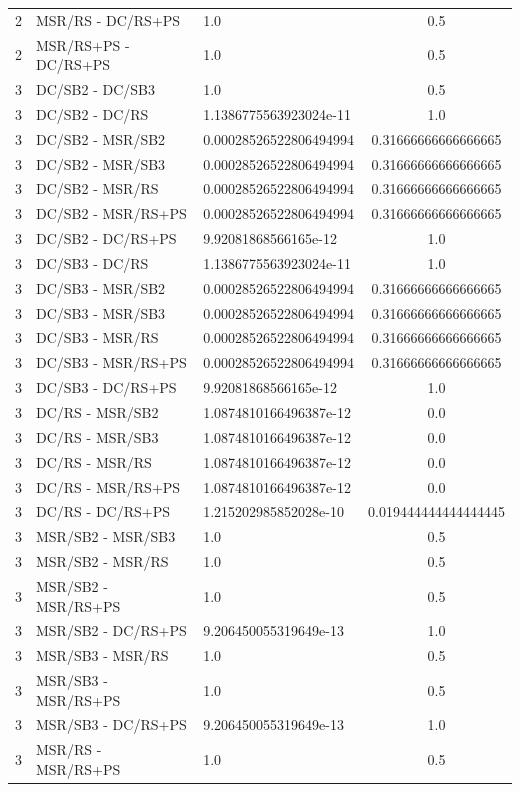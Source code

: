 \documentclass[10pt,a4paper]{article}
\begin{document}
\begin{longtable}{c l l c}
2 & MSR/RS - DC/RS+PS & 1.0 & 0.5 \\
2 & MSR/RS+PS - DC/RS+PS & 1.0 & 0.5 \\
\midrule
3 & DC/SB2 - DC/SB3 & 1.0 & 0.5 \\
3 & DC/SB2 - DC/RS & 1.1386775563923024e-11 & 1.0 \\
3 & DC/SB2 - MSR/SB2 & 0.00028526522806494994 & 0.31666666666666665 \\
3 & DC/SB2 - MSR/SB3 & 0.00028526522806494994 & 0.31666666666666665 \\
3 & DC/SB2 - MSR/RS & 0.00028526522806494994 & 0.31666666666666665 \\
3 & DC/SB2 - MSR/RS+PS & 0.00028526522806494994 & 0.31666666666666665 \\
3 & DC/SB2 - DC/RS+PS & 9.92081868566165e-12 & 1.0 \\
3 & DC/SB3 - DC/RS & 1.1386775563923024e-11 & 1.0 \\
3 & DC/SB3 - MSR/SB2 & 0.00028526522806494994 & 0.31666666666666665 \\
3 & DC/SB3 - MSR/SB3 & 0.00028526522806494994 & 0.31666666666666665 \\
3 & DC/SB3 - MSR/RS & 0.00028526522806494994 & 0.31666666666666665 \\
3 & DC/SB3 - MSR/RS+PS & 0.00028526522806494994 & 0.31666666666666665 \\
3 & DC/SB3 - DC/RS+PS & 9.92081868566165e-12 & 1.0 \\
3 & DC/RS - MSR/SB2 & 1.0874810166496387e-12 & 0.0 \\
3 & DC/RS - MSR/SB3 & 1.0874810166496387e-12 & 0.0 \\
3 & DC/RS - MSR/RS & 1.0874810166496387e-12 & 0.0 \\
3 & DC/RS - MSR/RS+PS & 1.0874810166496387e-12 & 0.0 \\
3 & DC/RS - DC/RS+PS & 1.215202985852028e-10 & 0.019444444444444445 \\
3 & MSR/SB2 - MSR/SB3 & 1.0 & 0.5 \\
3 & MSR/SB2 - MSR/RS & 1.0 & 0.5 \\
3 & MSR/SB2 - MSR/RS+PS & 1.0 & 0.5 \\
3 & MSR/SB2 - DC/RS+PS & 9.206450055319649e-13 & 1.0 \\
3 & MSR/SB3 - MSR/RS & 1.0 & 0.5 \\
3 & MSR/SB3 - MSR/RS+PS & 1.0 & 0.5 \\
3 & MSR/SB3 - DC/RS+PS & 9.206450055319649e-13 & 1.0 \\
3 & MSR/RS - MSR/RS+PS & 1.0 & 0.5 \\

\end{longtable}
\end{document}
